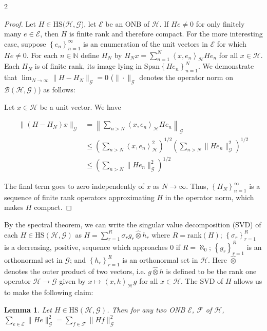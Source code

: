 \documentclass{article}
\numberwithin{theorem}{section}
\newtheorem{lemma}{Lemma}
\numberwithin{lemma}{section}
\numberwithin{definition}{section}
\numberwithin{assumption}{section}
\numberwithin{proposition}{section}
\numberwithin{remark}{section}
\numberwithin{corollary}{section}
\numberwithin{conjecture}{section}
\numberwithin{example}{section}
\newcommand{\N}{\mathbb{N}}
\newcommand{\bset}[1]{\left \lbrace #1 \right \rbrace}
\newcommand{\aset}[1]{\left \langle #1 \right \rangle}
\newcommand{\Span}[1]{\mathrm{Span}\bset{#1}}
\newcommand{\HS}{\mathrm{HS}}
\newcommand{\CH}{\mathcal H}
\begin{document}
\begin{multicols*}{2}
 \begin{proof} 
Let $H \in \HS(\mathcal H, \mathcal G$), let $\mathscr E$ be an ONB of $\mathcal H$. If $He \neq 0$ for only finitely many $e \in \mathscr E$, then $H$ is finite rank and therefore compact. For the more interesting case, suppose $\bset{e_n}_{n=1}^\infty$ is an enumeration of the unit vectors in $\mathscr E$ for which $He \neq 0$. For each $n \in \N$ define $H_N$ by $H_Nx = \sum_{n=1}^N \aset{x, e_n}_\CH He_n$ for all $x \in \CH$. Each $H_N$ is of finite rank, its image lying in $\Span{He_n}_{n=1}^N$. We demonstrate that $\lim_{N\to \infty} \|H - H_N\|_\mathcal G = 0$ ($\|\cdot\|_\mathcal G$ denotes the operator norm on $\mathcal B(\mathcal H, \mathcal G)$) as follows: 

Let $x \in \CH$ be a unit vector. We have 

\begin{align*}
	\|(H - H_N)x\|_\mathcal G &= 
	\left \|	\sum_{n > N} \aset{x, e_n}_\CH He_n  \right \|_\mathcal G
	\\&\leq
	\left( \sum_{n > N} \aset{x, e_n}_\CH^2 \right)^{1/2} \left( \sum_{n >N}\| He_n \|_\mathcal G^2 \right)^{1/2}
	\\&\leq
	\left( \sum_{n >N}\| He_n \|_\mathcal G^2 \right)^{1/2}
\end{align*}

The final term goes to zero independently of $x$ as $N \to \infty$. Thus, $\bset{H_N}_{n = 1}^\infty$ is a sequence of finite rank operators approximating $H$ in the operator norm, which makes $H$ compact. 
 \end{proof}


By the spectral theorem, we can write the singular value decomposition (SVD) of each $H \in \HS(\mathcal H, \mathcal G)$ as $H = \sum_{r=1}^R \sigma_r g_r \widehat \otimes h_r$ where $R = \text{rank}(H)$; $\bset{\sigma_r}_{r=1}^R$ is a decreasing, positive, sequence which approaches 0 if $R = \aleph_0$; $\bset{g_r}_{r=1}^R$ is an orthonormal set in $\mathcal G$; and $\bset{h_r}_{r=1}^R$ is an  orthonormal set in $\CH$. Here $\widehat \otimes$ denotes the outer product of two vectors, i.e. $g \widehat \otimes h$ is defined to be the rank one operator $\mathcal H \to \mathcal G$ given by $x \mapsto \aset{x,h}_\mathcal H g$ for all $x \in \CH$. The SVD of $H$ allows us to make the following claim: 

\begin{lemma} \label{HS norm is independent of ONB}
Let $H \in \HS(\mathcal H, \mathcal G)$. Then for any two ONB $\mathscr E$, $\mathscr F$ of $\CH$, $\sum_{e \in \mathscr E} \|He\|_\mathcal G^2 = \sum_{f \in \mathscr F} \|Hf\|_\mathcal G^2$
\end{lemma}


\end{multicols*}
\end{document}
